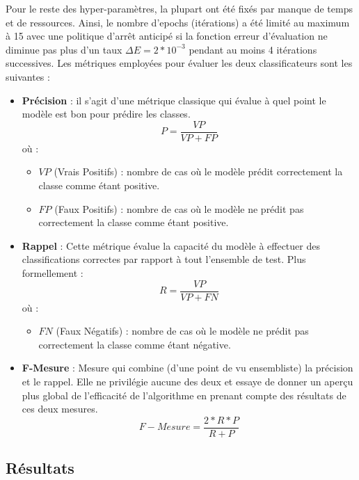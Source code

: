 	\par
	Pour le reste des hyper-paramètres, la plupart ont été fixés par manque de temps et de ressources. Ainsi, le nombre d'epochs (itérations) a été limité au maximum à 15 avec une politique d'arrêt anticipé si la fonction erreur d'évaluation ne diminue pas plus d'un taux $\Delta E = 2*10^{-3}$ pendant au moins 4 itérations successives. Les métriques employées pour évaluer les deux classificateurs sont les suivantes : 
	\begin{itemize}
		\item \textbf{Précision} : il s'agit d'une métrique classique qui évalue à quel point le modèle est bon pour prédire les classes.
		\begin{equation*}
			P = \frac{VP}{VP+FP}
		\end{equation*}
		où : 
		\begin{itemize}
			\item $VP$ (Vrais Positifs) : nombre de cas où le modèle prédit correctement la classe comme étant positive.
			\item $FP$ (Faux Positifs) : nombre de cas où le modèle ne prédit pas correctement la classe comme étant positive.
		\end{itemize}

		\item \textbf{Rappel} : Cette métrique évalue la capacité du modèle à effectuer des classifications correctes par rapport à tout l'ensemble de test. Plus formellement : 
		\begin{equation*}
		R = \frac{VP}{VP+FN}
		\end{equation*}
		où : 
		\begin{itemize}
			\item $FN$ (Faux Négatifs) : nombre de cas où le modèle ne prédit pas correctement la classe comme étant négative.
		\end{itemize}
	
		\item \textbf{F-Mesure} : Mesure qui combine (d'une point de vu ensembliste) la précision et le rappel. Elle ne privilégie aucune des deux et essaye de donner un aperçu plus global de l'efficacité de l'algorithme en prenant compte des résultats de ces deux mesures.
		\begin{equation*}
		F-Mesure = \frac{2*R*P}{R+P}
		\end{equation*}
	\end{itemize}
	\subsection{Résultats}
